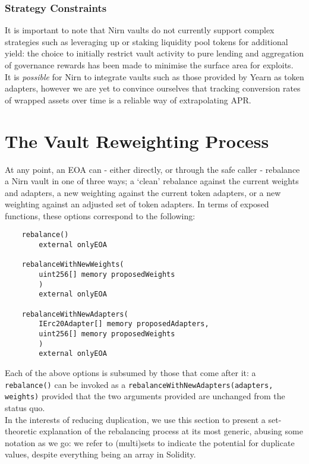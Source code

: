 \documentclass{article}
\begin{document}
\subsubsection{Strategy Constraints}

It is important to note that Nirn vaults do not currently support complex strategies such as leveraging up or staking liquidity pool tokens for additional yield: the choice to initially restrict vault activity to pure lending and aggregation of governance rewards has been made to minimise the surface area for exploits.\\

\noindent
It is \textit{possible} for Nirn to integrate vaults such as those provided by Yearn as token adapters, however we are yet to convince ourselves that tracking conversion rates of wrapped assets over time is a reliable way of extrapolating APR.

\newpage
\section{The Vault Reweighting Process}

At any point, an EOA can - either directly, or through the safe caller - rebalance a Nirn vault in one of three ways; a `clean' rebalance against the current weights and adapters, a new weighting against the current token adapters, or a new weighting against an adjusted set of token adapters. In terms of exposed functions, these options correspond to the following:

\begin{verbatim}
    rebalance()
        external onlyEOA
    
    rebalanceWithNewWeights(
        uint256[] memory proposedWeights
        ) 
        external onlyEOA
        
    rebalanceWithNewAdapters(
        IErc20Adapter[] memory proposedAdapters,
        uint256[] memory proposedWeights
        )
        external onlyEOA
\end{verbatim}

\noindent
Each of the above options is subsumed by those that come after it: a \texttt{rebalance()} can be invoked as a \texttt{rebalanceWithNewAdapters(adapters, weights)} provided that the two arguments provided are unchanged from the status quo.\\

\noindent
In the interests of reducing duplication, we use this section to present a set-theoretic explanation of the rebalancing process at its most generic, abusing some notation as we go: we refer to (multi)sets to indicate the potential for duplicate values, despite everything being an array in Solidity.\\
\end{document}
